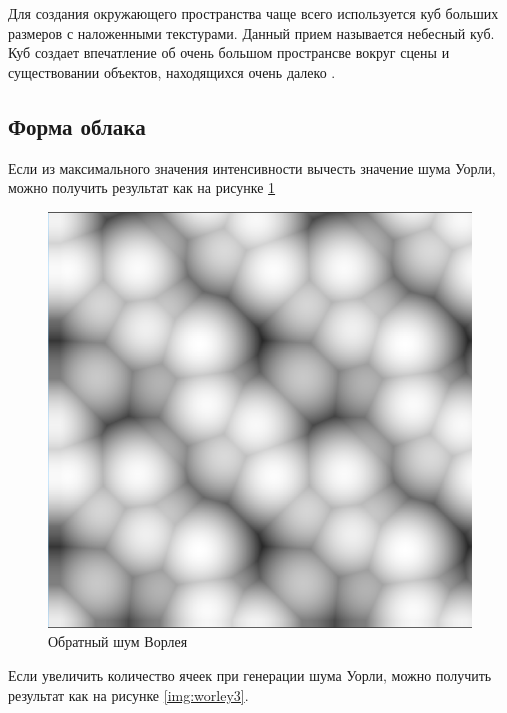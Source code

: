 Для создания окружающего пространства чаще всего используется куб больших размеров с наложенными текстурами.
Данный прием называется небесный куб. Куб создает впечатление об очень большом пространсве вокруг сцены и
существовании объектов, находящихся очень далеко \cite{SkyBox}.

\subsection{Форма облака}

Если из максимального значения интенсивности вычесть значение шума Уорли, можно получить результат как на рисунке \ref{img:worley2}

\begin{figure}[H]
    \centering
    \includegraphics[scale=0.4]{img/worley2.png}
    \caption{Обратный шум Ворлея}
    \label{img:worley2}
\end{figure}

Если увеличить количество ячеек при генерации шума Уорли, можно получить результат как на рисунке \ref{img:worley3}.

